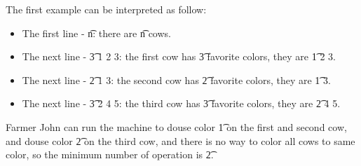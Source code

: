 The first example can be interpreted as follow:
\begin{itemize}
  \item The first line - \t{n}: there are \t{n} cows.
  \item The next line - \t{3 1 2 3}: the first cow has \t{3} favorite colors, they are \t{1 2 3}.
  \item The next line - \t{2 1 3}: the second cow has \t{2} favorite colors, they are \t{1 3}.
  \item The next line - \t{3 2 4 5}: the third cow has \t{3} favorite colors, they are \t{2 4 5}.
\end{itemize}

Farmer John can run the machine to douse color \t{1} on the first and second cow,
and douse color \t{2} on the third cow, and there is no way to color all cows to same color,
    so the minimum number of operation is \t{2}.

